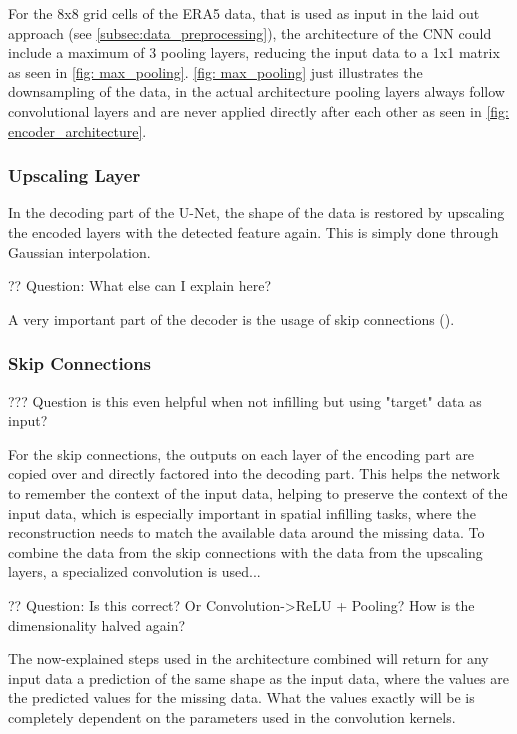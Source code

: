 For the 8x8 grid cells of the ERA5 data, that is used as input in the laid out approach (see \autoref{subsec:data_preprocessing}), the architecture of the CNN could include a maximum of 3 pooling layers, reducing the input data to a 1x1 matrix as seen in \autoref{fig: max_pooling}. \autoref{fig: max_pooling} just illustrates the downsampling of the data, in the actual architecture pooling layers always follow convolutional layers and are never applied directly after each other as seen in \autoref{fig: encoder_architecture}. 


\subsubsection*{Upscaling Layer}

In the decoding part of the U-Net, the shape of the data is restored by upscaling the encoded layers with the detected feature again. This is simply done through Gaussian interpolation.

?? Question: What else can I explain here?

A very important part of the decoder is the usage of skip connections (\cite{liu2018inpaining}). 

\subsubsection*{Skip Connections}

??? Question is this even helpful when not infilling but using "target" data as input?

For the skip connections, the outputs on each layer of the encoding part are copied over and directly factored into the decoding part. This helps the network to remember the context of the input data, helping to preserve the context of the input data, which is especially important in spatial infilling tasks, where the reconstruction needs to match the available data around the missing data. To combine the data from the skip connections with the data from the upscaling layers, a specialized convolution is used... 

?? Question: Is this correct? Or Convolution->ReLU + Pooling? How is the dimensionality halved again?

The now-explained steps used in the architecture combined will return for any input data a prediction of the same shape as the input data, where the values are the predicted values for the missing data. What the values exactly will be is completely dependent on the parameters used in the convolution kernels.


